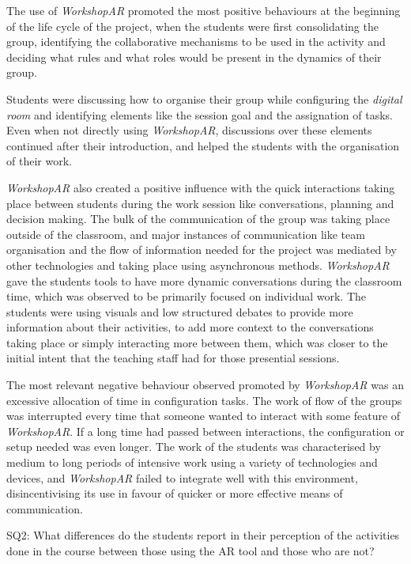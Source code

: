 The use of \emph{WorkshopAR} promoted the most positive behaviours at the beginning of the life cycle of the project, when the students were first consolidating the group,
identifying the collaborative mechanisms to be used in the activity and deciding what rules and what roles would be present in the dynamics of their group.

Students were discussing how to organise their group while configuring the \emph{digital room} and identifying elements like the session goal and the assignation of tasks.
Even when not directly using \emph{WorkshopAR}, discussions over these elements continued after their introduction, and helped the students with the organisation of their
work.

\emph{WorkshopAR} also created a positive influence with the quick interactions taking place between students during the work session like conversations, planning and
decision making. The bulk of the communication of the group was taking place outside of the classroom, and major instances of communication like team organisation and the
flow of information needed for the project was mediated by other technologies and taking place using asynchronous methods. \emph{WorkshopAR} gave the students tools to have more
dynamic conversations during the classroom time, which was observed to be primarily focused on individual work. The students were using visuals and low structured debates
to provide more information about their activities, to add more context to the conversations taking place or simply interacting more between them, which was closer to the
initial intent that the teaching staff had for those presential sessions.

The most relevant negative behaviour observed promoted by \emph{WorkshopAR} was an excessive allocation of time in configuration tasks. The work of flow of the groups was
interrupted every time that someone wanted to interact with some feature of \emph{WorkshopAR}. If a long time had passed between interactions, the configuration or setup
needed was even longer. The work of the students was characterised by medium to long periods of intensive work using a variety of technologies and devices, and \emph{WorkshopAR}
failed to integrate well with this environment, disincentivising its use in favour of quicker or more effective means of communication.

\begin{displayquote}
    SQ2: What differences do the students report in their perception of the activities done in the course between those using the \ac{AR} tool and those who are not? 
\end{displayquote}

